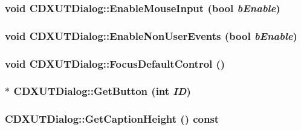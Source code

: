 \label{class_c_d_x_u_t_dialog_a0022392f6e443b015ad8692aa6ab5442}
\hypertarget{class_c_d_x_u_t_dialog_a109b115dd423e6cb42c7fc02bea65ea3}{
\subsubsection[{EnableMouseInput}]{\setlength{\rightskip}{0pt plus 5cm}void CDXUTDialog::EnableMouseInput (bool {\em bEnable})}}
\label{class_c_d_x_u_t_dialog_a109b115dd423e6cb42c7fc02bea65ea3}
\hypertarget{class_c_d_x_u_t_dialog_ab4fad093a2509e6813b22cd9342bbff1}{
\subsubsection[{EnableNonUserEvents}]{\setlength{\rightskip}{0pt plus 5cm}void CDXUTDialog::EnableNonUserEvents (bool {\em bEnable})}}
\label{class_c_d_x_u_t_dialog_ab4fad093a2509e6813b22cd9342bbff1}
\hypertarget{class_c_d_x_u_t_dialog_a3a1acadb4feabee897e520b2dbf24fe2}{
\subsubsection[{FocusDefaultControl}]{\setlength{\rightskip}{0pt plus 5cm}void CDXUTDialog::FocusDefaultControl ()}}
\label{class_c_d_x_u_t_dialog_a3a1acadb4feabee897e520b2dbf24fe2}
\hypertarget{class_c_d_x_u_t_dialog_a3dc0b6d056c7bc9c035c808d4b2b8803}{
\subsubsection[{GetButton}]{$\ast$ CDXUTDialog::GetButton ({\bf int} {\em ID})}}
\label{class_c_d_x_u_t_dialog_a3dc0b6d056c7bc9c035c808d4b2b8803}
\hypertarget{class_c_d_x_u_t_dialog_a72a80373de83c0a368e04e9d1266494c}{
\subsubsection[{GetCaptionHeight}]{ CDXUTDialog::GetCaptionHeight () const}}
